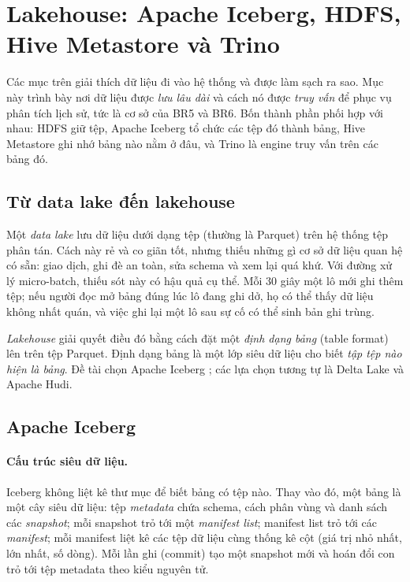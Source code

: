 \section{Lakehouse: Apache Iceberg, HDFS, Hive Metastore và Trino}
\label{sec:2-lakehouse}

Các mục trên giải thích dữ liệu đi vào hệ thống và được làm sạch ra sao. Mục này trình bày nơi dữ liệu được \emph{lưu lâu dài} và cách nó được \emph{truy vấn} để phục vụ phân tích lịch sử, tức là cơ sở của BR5 và BR6. Bốn thành phần phối hợp với nhau: HDFS giữ tệp, Apache Iceberg tổ chức các tệp đó thành bảng, Hive Metastore ghi nhớ bảng nào nằm ở đâu, và Trino là engine truy vấn trên các bảng đó.

\subsection{Từ data lake đến lakehouse}
\label{sec:2-lake-to-lakehouse}

Một \emph{data lake} lưu dữ liệu dưới dạng tệp (thường là Parquet) trên hệ thống tệp phân tán. Cách này rẻ và co giãn tốt, nhưng thiếu những gì cơ sở dữ liệu quan hệ có sẵn: giao dịch, ghi đè an toàn, sửa schema và xem lại quá khứ. Với đường xử lý micro-batch, thiếu sót này có hậu quả cụ thể. Mỗi 30 giây một lô mới ghi thêm tệp; nếu người đọc mở bảng đúng lúc lô đang ghi dở, họ có thể thấy dữ liệu không nhất quán, và việc ghi lại một lô sau sự cố có thể sinh bản ghi trùng.

\emph{Lakehouse} giải quyết điều đó bằng cách đặt một \emph{định dạng bảng} (table format) lên trên tệp Parquet. Định dạng bảng là một lớp siêu dữ liệu cho biết \emph{tập tệp nào hiện là bảng}. Đề tài chọn Apache Iceberg \cite{iceberg_spec}; các lựa chọn tương tự là Delta Lake và Apache Hudi.

\subsection{Apache Iceberg}
\label{sec:2-iceberg}

\paragraph{Cấu trúc siêu dữ liệu.} Iceberg không liệt kê thư mục để biết bảng có tệp nào. Thay vào đó, một bảng là một cây siêu dữ liệu: tệp \emph{metadata} chứa schema, cách phân vùng và danh sách các \emph{snapshot}; mỗi snapshot trỏ tới một \emph{manifest list}; manifest list trỏ tới các \emph{manifest}; mỗi manifest liệt kê các tệp dữ liệu cùng thống kê cột (giá trị nhỏ nhất, lớn nhất, số dòng). Mỗi lần ghi (commit) tạo một snapshot mới và hoán đổi con trỏ tới tệp metadata theo kiểu nguyên tử.

